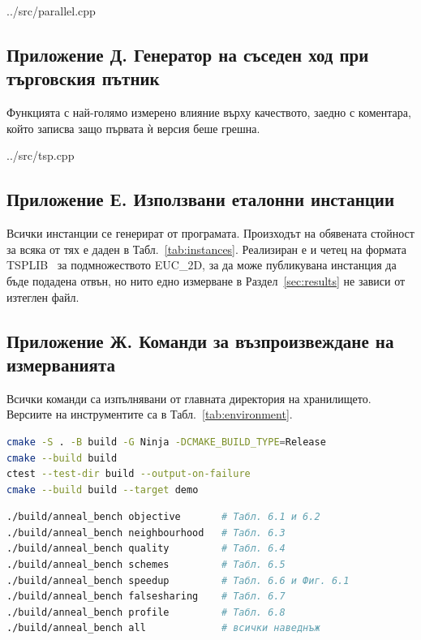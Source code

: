 %
{../src/parallel.cpp}

\subsection*{Приложение Д. Генератор на съседен ход при търговския пътник}

Функцията с най-голямо измерено влияние върху качеството, заедно с коментара, който
записва защо първата ѝ версия беше грешна.

%
{../src/tsp.cpp}

\subsection*{Приложение Е. Използвани еталонни инстанции}

Всички инстанции се генерират от програмата. Произходът на обявената стойност за всяка
от тях е даден в Табл.~\ref{tab:instances}. Реализиран е и четец на формата
TSPLIB~\cite{reinelt1991tsplib} за подмножеството EUC\_2D, за да може публикувана
инстанция да бъде подадена отвън, но нито едно измерване в Раздел~\ref{sec:results} не
зависи от изтеглен файл.

\subsection*{Приложение Ж. Команди за възпроизвеждане на измерванията}

Всички команди са изпълнявани от главната директория на хранилището. Версиите на
инструментите са в Табл.~\ref{tab:environment}.

\begin{lstlisting}[language=bash, caption={Изграждане, тестове, демонстрация}, label={lst:build}]
cmake -S . -B build -G Ninja -DCMAKE_BUILD_TYPE=Release
cmake --build build
ctest --test-dir build --output-on-failure
cmake --build build --target demo
\end{lstlisting}

\begin{lstlisting}[language=bash, caption={Измервания, по едно за всяка таблица}, label={lst:bench}]
./build/anneal_bench objective       # Табл. 6.1 и 6.2
./build/anneal_bench neighbourhood   # Табл. 6.3
./build/anneal_bench quality         # Табл. 6.4
./build/anneal_bench schemes         # Табл. 6.5
./build/anneal_bench speedup         # Табл. 6.6 и Фиг. 6.1
./build/anneal_bench falsesharing    # Табл. 6.7
./build/anneal_bench profile         # Табл. 6.8
./build/anneal_bench all             # всички наведнъж
\end{lstlisting}


